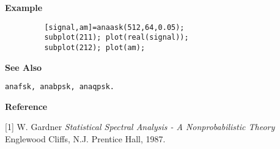 {\bf \large {}\selectfont Example}
\begin{verbatim}
         [signal,am]=anaask(512,64,0.05); 
         subplot(211); plot(real(signal)); 
         subplot(212); plot(am);
\end{verbatim}
\vspace*{.5cm}


{\bf \large {}\selectfont See Also}\\
\hspace*{1.5cm}
\begin{minipage}[t]{13.5cm}
\begin{verbatim}
anafsk, anabpsk, anaqpsk.
\end{verbatim}
\end{minipage}
\vspace*{.5cm}


{\bf \large {}\selectfont Reference}\\
\hspace*{1.5cm}
\begin{minipage}[t]{13.5cm}
[1] W. Gardner {\it Statistical Spectral Analysis - A Nonprobabilistic
Theory} Englewood Cliffs, N.J. Prentice Hall, 1987.
\end{minipage}
